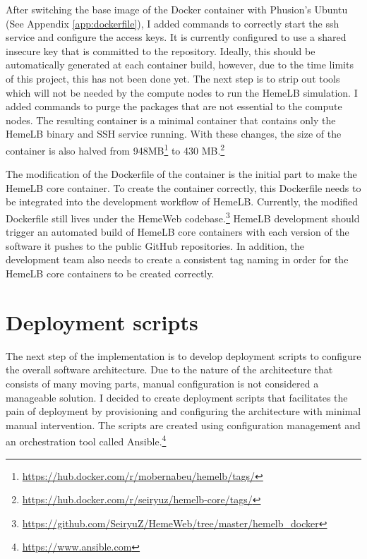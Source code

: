 After switching the base image of the Docker container with Phusion's Ubuntu (See Appendix  \ref{app:dockerfile}), I added commands to correctly start the ssh service and configure the access keys. It is currently configured to use a shared insecure key that is committed to the repository. Ideally, this should be automatically generated at each container build, however, due to the time limits of this project, this has not been done yet. The next step is to strip out tools which will not be needed by the compute nodes to run the HemeLB simulation. I added commands to purge the packages that are not essential to the compute nodes. The resulting container is a minimal container that contains only the HemeLB binary and SSH service running. With these changes, the size of the container is also halved from 948MB\footnote{\url{https://hub.docker.com/r/mobernabeu/hemelb/tags/}} to 430 MB.\footnote{\url{https://hub.docker.com/r/seiryuz/hemelb-core/tags/}}


The modification of the Dockerfile of the container is the initial part to make the HemeLB core container. To create the container correctly, this Dockerfile needs to be integrated into the development workflow of HemeLB. Currently, the modified Dockerfile still lives under the HemeWeb codebase.\footnote{\url{https://github.com/SeiryuZ/HemeWeb/tree/master/hemelb_docker}} HemeLB development should trigger an automated build of HemeLB core containers with each version of the software it pushes to the public GitHub repositories. In addition, the development team also needs to create a consistent tag naming in order for the HemeLB core containers to be created correctly.


\section{Deployment scripts}

The next step of the implementation is to develop deployment scripts to configure the overall software architecture. Due to the nature of the architecture that consists of many moving parts, manual configuration is not considered a manageable solution. I decided to create deployment scripts that facilitates the pain of deployment by provisioning and configuring the architecture with minimal manual intervention. The scripts are created using configuration management and an orchestration tool called Ansible.\footnote{\url{https://www.ansible.com}}

